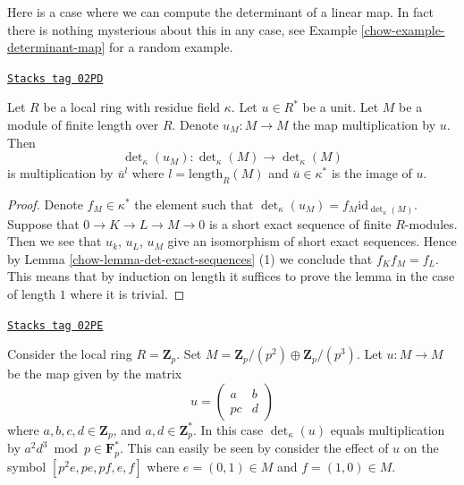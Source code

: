 Here is a case where we can compute the determinant of a linear map.
In fact there is nothing mysterious about this in any case, see
Example \ref{chow-example-determinant-map} for a random example.

\begin{lemma}
\label{chow-lemma-times-u-determinant}
\href{https://stacks.math.columbia.edu/tag/02PD}{\texttt{Stacks tag 02PD}}

Let $R$ be a local ring with residue field $\kappa$.
Let $u \in R^*$ be a unit.
Let $M$ be a module of finite length over $R$.
Denote $u_M : M \to M$ the map multiplication by $u$.
Then
$$
\det\nolimits_\kappa(u_M) :
\det\nolimits_\kappa(M)
\longrightarrow
\det\nolimits_\kappa(M)
$$
is multiplication by $\overline{u}^l$ where $l = \text{length}_R(M)$
and $\overline{u} \in \kappa^*$ is the image of $u$.
\end{lemma}

\begin{proof}

Denote $f_M \in \kappa^*$ the element such that
$\det\nolimits_\kappa(u_M) = f_M \text{id}_{\det\nolimits_\kappa(M)}$.
Suppose that $0 \to K \to L \to M \to 0$ is a short
exact sequence of finite $R$-modules. Then we see that
$u_k$, $u_L$, $u_M$ give an isomorphism of short exact sequences.
Hence by Lemma \ref{chow-lemma-det-exact-sequences} (1) we conclude that
$f_K f_M = f_L$.
This means that by induction on length it suffices to prove the
lemma in the case of length $1$ where it is trivial.
\end{proof}

\begin{example}
\label{chow-example-determinant-map}
\href{https://stacks.math.columbia.edu/tag/02PE}{\texttt{Stacks tag 02PE}}

Consider the local ring $R = \mathbf{Z}_p$.
Set $M = \mathbf{Z}_p/(p^2) \oplus \mathbf{Z}_p/(p^3)$.
Let $u : M \to M$ be the map given by the matrix
$$
u =
\left(
\begin{matrix}
a & b \\
pc & d
\end{matrix}
\right)
$$
where $a, b, c, d \in \mathbf{Z}_p$, and $a, d \in \mathbf{Z}_p^*$.
In this case $\det_\kappa(u)$ equals multiplication by
$a^2d^3 \bmod p \in \mathbf{F}_p^*$. This can easily be seen
by consider the effect of $u$ on the symbol
$[p^2e, pe, pf, e, f]$ where $e = (0 , 1) \in M$ and
$f = (1, 0) \in M$.
\end{example}


